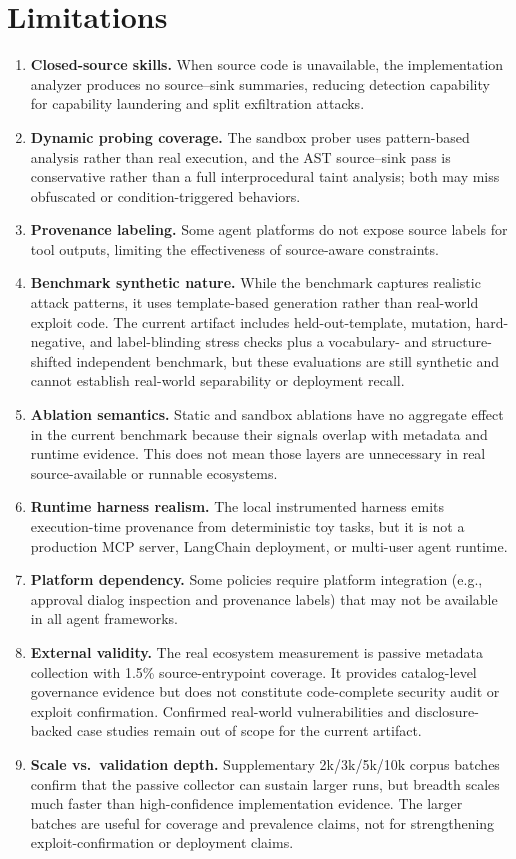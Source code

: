 \documentclass[10pt]{article}
\begin{document}
\section{Limitations}
\label{sec:limitations}

\begin{enumerate}[leftmargin=*]
\item \textbf{Closed-source skills.} When source code is unavailable, the implementation analyzer produces no source--sink summaries, reducing detection capability for capability laundering and split exfiltration attacks.
\item \textbf{Dynamic probing coverage.} The sandbox prober uses pattern-based analysis rather than real execution, and the AST source--sink pass is conservative rather than a full interprocedural taint analysis; both may miss obfuscated or condition-triggered behaviors.
\item \textbf{Provenance labeling.} Some agent platforms do not expose source labels for tool outputs, limiting the effectiveness of source-aware constraints.
\item \textbf{Benchmark synthetic nature.} While the benchmark captures realistic attack patterns, it uses template-based generation rather than real-world exploit code. The current artifact includes held-out-template, mutation, hard-negative, and label-blinding stress checks plus a vocabulary- and structure-shifted independent benchmark, but these evaluations are still synthetic and cannot establish real-world separability or deployment recall.
\item \textbf{Ablation semantics.} Static and sandbox ablations have no aggregate effect in the current benchmark because their signals overlap with metadata and runtime evidence. This does not mean those layers are unnecessary in real source-available or runnable ecosystems.
\item \textbf{Runtime harness realism.} The local instrumented harness emits execution-time provenance from deterministic toy tasks, but it is not a production MCP server, LangChain deployment, or multi-user agent runtime.
\item \textbf{Platform dependency.} Some policies require platform integration (e.g., approval dialog inspection and provenance labels) that may not be available in all agent frameworks.
\item \textbf{External validity.} The real ecosystem measurement is passive metadata collection with 1.5\% source-entrypoint coverage. It provides catalog-level governance evidence but does not constitute code-complete security audit or exploit confirmation. Confirmed real-world vulnerabilities and disclosure-backed case studies remain out of scope for the current artifact.
\item \textbf{Scale vs.~validation depth.} Supplementary 2k/3k/5k/10k corpus batches confirm that the passive collector can sustain larger runs, but breadth scales much faster than high-confidence implementation evidence. The larger batches are useful for coverage and prevalence claims, not for strengthening exploit-confirmation or deployment claims.
\end{enumerate}
\end{document}
